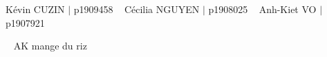Kévin CUZIN $\vert$ p1909458 ~\newline
 Cécilia NGUYEN $\vert$ p1908025 ~\newline
 Anh-\/\+Kiet VO $\vert$ p1907921 ~\newline




 ~\newline
 AK mange du riz 